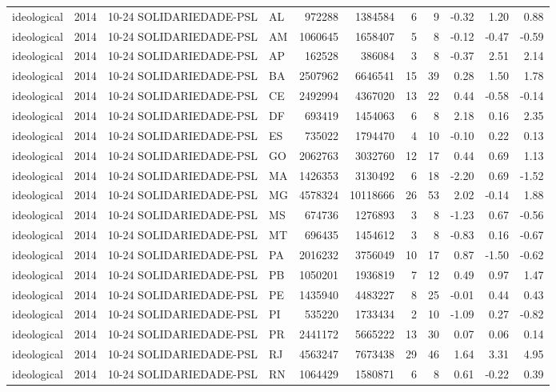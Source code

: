 \begin{landscape}
\begin{longtable}{lllL{1.4cm}rrrrrrr}
ideological & 2014 & 10-24 SOLIDARIEDADE-PSL & AL & 972288 & 1384584 & 6 & 9 & -0.32 & 1.20 & 0.88 \\
ideological & 2014 & 10-24 SOLIDARIEDADE-PSL & AM & 1060645 & 1658407 & 5 & 8 & -0.12 & -0.47 & -0.59 \\
ideological & 2014 & 10-24 SOLIDARIEDADE-PSL & AP & 162528 & 386084 & 3 & 8 & -0.37 & 2.51 & 2.14 \\
ideological & 2014 & 10-24 SOLIDARIEDADE-PSL & BA & 2507962 & 6646541 & 15 & 39 & 0.28 & 1.50 & 1.78 \\
ideological & 2014 & 10-24 SOLIDARIEDADE-PSL & CE & 2492994 & 4367020 & 13 & 22 & 0.44 & -0.58 & -0.14 \\
ideological & 2014 & 10-24 SOLIDARIEDADE-PSL & DF & 693419 & 1454063 & 6 & 8 & 2.18 & 0.16 & 2.35 \\
ideological & 2014 & 10-24 SOLIDARIEDADE-PSL & ES & 735022 & 1794470 & 4 & 10 & -0.10 & 0.22 & 0.13 \\
ideological & 2014 & 10-24 SOLIDARIEDADE-PSL & GO & 2062763 & 3032760 & 12 & 17 & 0.44 & 0.69 & 1.13 \\
ideological & 2014 & 10-24 SOLIDARIEDADE-PSL & MA & 1426353 & 3130492 & 6 & 18 & -2.20 & 0.69 & -1.52 \\
ideological & 2014 & 10-24 SOLIDARIEDADE-PSL & MG & 4578324 & 10118666 & 26 & 53 & 2.02 & -0.14 & 1.88 \\
ideological & 2014 & 10-24 SOLIDARIEDADE-PSL & MS & 674736 & 1276893 & 3 & 8 & -1.23 & 0.67 & -0.56 \\
ideological & 2014 & 10-24 SOLIDARIEDADE-PSL & MT & 696435 & 1454612 & 3 & 8 & -0.83 & 0.16 & -0.67 \\
ideological & 2014 & 10-24 SOLIDARIEDADE-PSL & PA & 2016232 & 3756049 & 10 & 17 & 0.87 & -1.50 & -0.62 \\
ideological & 2014 & 10-24 SOLIDARIEDADE-PSL & PB & 1050201 & 1936819 & 7 & 12 & 0.49 & 0.97 & 1.47 \\
ideological & 2014 & 10-24 SOLIDARIEDADE-PSL & PE & 1435940 & 4483227 & 8 & 25 & -0.01 & 0.44 & 0.43 \\
ideological & 2014 & 10-24 SOLIDARIEDADE-PSL & PI & 535220 & 1733434 & 2 & 10 & -1.09 & 0.27 & -0.82 \\
ideological & 2014 & 10-24 SOLIDARIEDADE-PSL & PR & 2441172 & 5665222 & 13 & 30 & 0.07 & 0.06 & 0.14 \\
ideological & 2014 & 10-24 SOLIDARIEDADE-PSL & RJ & 4563247 & 7673438 & 29 & 46 & 1.64 & 3.31 & 4.95 \\
ideological & 2014 & 10-24 SOLIDARIEDADE-PSL & RN & 1064429 & 1580871 & 6 & 8 & 0.61 & -0.22 & 0.39 \\

\end{longtable}
\end{landscape}
